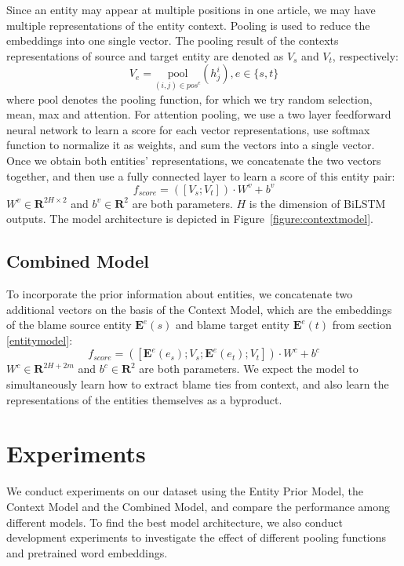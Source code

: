 \documentclass[letterpaper]{article}
\begin{document}
Since an entity may appear at multiple positions in one article, we may have multiple representations of the entity context. Pooling is used to reduce the embeddings into one single vector. The pooling result of the contexts representations of source and target entity are denoted as $V_s$ and $V_t$, respectively: $$V_e = \underset{(i, j) \in pos^e} {\mathrm{pool}} (h^i_j), e \in \{s, t\}$$where $\mathrm{pool}$ denotes the pooling function, for which we try random selection, mean, max and attention. For attention pooling, we use a two layer feedforward neural network to learn a score for each vector representations, use softmax function to normalize it as weights, and sum the vectors into a single vector. Once we obtain both entities' representations, we concatenate the two vectors together, and then use a fully connected layer to learn a score of this entity pair: $$f_{score} = ([V_s; V_t]) \cdot W^v + b^v $$ $W^v \in \mathbf{R}^{2H \times 2}$ and $b^v \in \mathbf{R}^{2}$ are both parameters. $H$ is the dimension of BiLSTM outputs. The model architecture is depicted in Figure~\ref{figure:contextmodel}.

\subsection{Combined Model}

To incorporate the prior information about entities, we concatenate two additional vectors on the basis of the Context Model, which are the embeddings of the blame source entity $\mathbf{E}^e(s)$ and blame target entity $\mathbf{E}^e(t)$ from section \ref{entitymodel}: $$f_{score} = ([\mathbf{E}^e(e_s); V_s; \mathbf{E}^e(e_t); V_t]) \cdot W^c + b^c $$ $W^c \in \mathbf{R}^{2H + 2m}$ and $b^c \in \mathbf{R}^{2}$ are both parameters. We expect the model to simultaneously learn how to extract blame ties from context, and also learn the representations of the entities themselves as a byproduct.

\section{Experiments}
\label{experiment}

We conduct experiments on our dataset using the Entity Prior Model, the Context Model and the Combined Model, and compare the performance among different models. To find the best model architecture, we also conduct development experiments to investigate the effect of different pooling functions and pretrained word embeddings.
\end{document}
